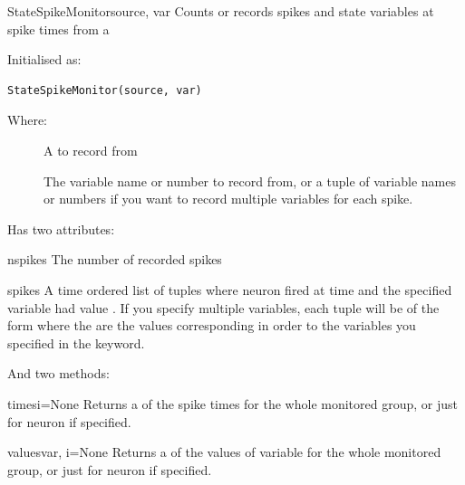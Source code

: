 \documentclass[letterpaper,10pt,english]{manual}
\begin{document}
\hypertarget{brian.StateSpikeMonitor}{}\begin{classdesc}{StateSpikeMonitor}{source, var}
Counts or records spikes and state variables at spike times from a \hyperlink{brian.NeuronGroup}{}

Initialised as:

\begin{Verbatim}[commandchars=@\[\]]
StateSpikeMonitor(source, var)
\end{Verbatim}

Where:
\begin{description}
\item[]
A \hyperlink{brian.NeuronGroup}{} to record from

\item[]
The variable name or number to record from, or a tuple of variable names or numbers
if you want to record multiple variables for each spike.

\end{description}

Has two attributes:

\hypertarget{brian.StateSpikeMonitor.nspikes}{}\begin{memberdesc}{nspikes}
The number of recorded spikes
\end{memberdesc}

\hypertarget{brian.StateSpikeMonitor.spikes}{}\begin{memberdesc}{spikes}
A time ordered list of tuples  where neuron  fired
at time  and the specified variable had value . If you
specify multiple variables, each tuple will be of the form
 where the  are the values corresponding
in order to the variables you specified in the  keyword.
\end{memberdesc}

And two methods:

\hypertarget{brian.StateSpikeMonitor.times}{}\begin{methoddesc}{times}{i=None}
Returns a  of the spike times for the whole monitored
group, or just for neuron  if specified.
\end{methoddesc}

\hypertarget{brian.StateSpikeMonitor.values}{}\begin{methoddesc}{values}{var, i=None}
Returns a  of the values of variable  for the
whole monitored group, or just for neuron  if specified.
\end{methoddesc}
\end{classdesc}
\end{document}
